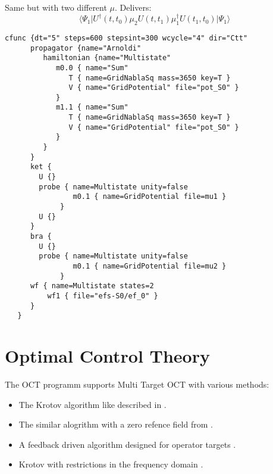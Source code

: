 \documentclass[a4paper,12pt]{scrbook}
\begin{document}
Same but with two different $\mu$.
Delivers:
\begin{equation*}
\langle \Psi_1\rvert U^\dagger(t,t_0)\mu_2 U(t,t_1)\mu_1^\dagger U(t_1,t_0)\lvert\Psi_1\rangle
\end{equation*}
\begin{verbatim}
cfunc {dt="5" steps=600 stepsint=300 wcycle="4" dir="Ctt"
      propagator {name="Arnoldi"
         hamiltonian {name="Multistate"
            m0.0 { name="Sum"
               T { name=GridNablaSq mass=3650 key=T }
               V { name="GridPotential" file="pot_S0" }
            }
            m1.1 { name="Sum"
               T { name=GridNablaSq mass=3650 key=T }
               V { name="GridPotential" file="pot_S0" }
            }
         }
      }
      ket {
        U {}
        probe { name=Multistate unity=false
                m0.1 { name=GridPotential file=mu1 }
             }
        U {}
      }
      bra {
        U {}
        probe { name=Multistate unity=false
                m0.1 { name=GridPotential file=mu2 }
             }
      wf { name=Multistate states=2
          wf1 { file="efs-S0/ef_0" }
      }
   }

\end{verbatim}

\section{Optimal Control Theory}
The OCT programm supports Multi Target OCT with various methods:
\begin{itemize}
 \item The Krotov algorithm like described in \cite{Palao03}.
 \item The similar alogrithm with a zero refence field from \cite{Zhu98}.
 \item A feedback driven algorithm designed for operator targets \cite{Zhu98FB}.
 \item Krotov with restrictions in the frequency domain \cite{Gollub08,Gollub10}.
\end{itemize}
\end{document}
